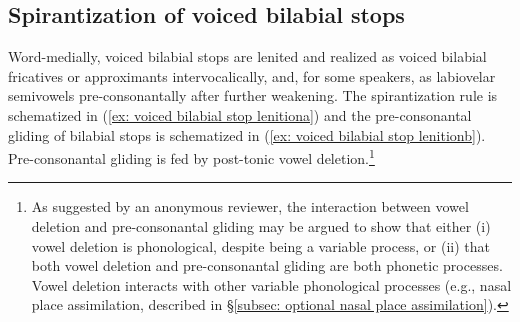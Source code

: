 


\subsection{Spirantization of voiced bilabial stops}
\label{subsec: spirantization of voiced bilabial stops}

Word-medially, voiced bilabial stops are lenited and realized as voiced bilabial fricatives or approximants intervocalically, and, for some speakers, as labiovelar semivowels pre-consonantally after further weakening. The spirantization rule is schematized in (\ref{ex: voiced bilabial stop lenitiona}) and the pre-consonantal gliding of bilabial stops is schematized in (\ref{ex: voiced bilabial stop lenitionb}). Pre-consonantal gliding is fed by post-tonic vowel deletion.\footnote{As suggested by an anonymous reviewer, the interaction between vowel deletion and pre-consonantal gliding may be argued to show that either (i) vowel deletion is phonological, despite being a variable process, or (ii) that both vowel deletion and pre-consonantal gliding are both phonetic processes. Vowel deletion interacts with other variable phonological processes (e.g., nasal place assimilation, described in §\ref{subsec: optional nasal place assimilation}).}

